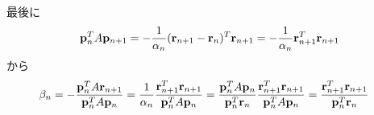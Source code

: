 \documentclass[11pt]{jarticle}
\begin{document}
最後に
\begin{align}
  {\bf p}_n^T A {\bf p}_{n+1} = -\frac{1}{\alpha_n} ({\bf r}_{n+1} - {\bf r}_n)^T {\bf r}_{n+1} = -\frac{1}{\alpha_n} {\bf r}_{n+1}^T {\bf r}_{n+1}
\end{align}
から
\begin{align}
  \beta_n &= - \frac{{\bf p}_{n}^T A {\bf r}_{n+1}}{{\bf p}_n^T A {\bf p}_n}
  = \frac{1}{\alpha_n} \frac{{\bf r}_{n+1}^T {\bf r}_{n+1}}{{\bf p}_n^T A {\bf p}_n}
  = \frac{{\bf p}_n^T A {\bf p}_n}{{\bf p}_n^T {\bf r}_n} \frac{{\bf r}_{n+1}^T {\bf r}_{n+1}}{{\bf p}_n^T A {\bf p}_n}
  =  \frac{{\bf r}_{n+1}^T {\bf r}_{n+1}}{{\bf p}_n^T {\bf r}_n}
\end{align}
\end{document}
